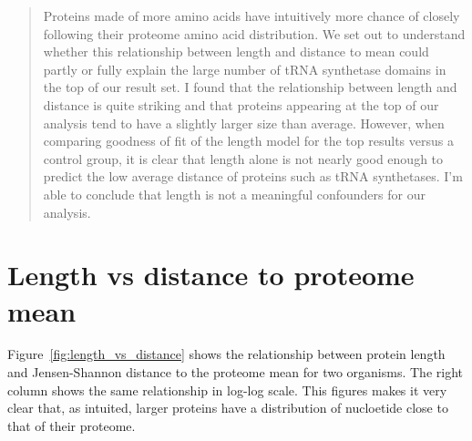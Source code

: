 \documentclass[12pt]{article}
\begin{document}
\maketitle

\begin{abstract}
Proteins made of more amino acids have intuitively more chance of closely following their proteome amino acid distribution. We set out to understand whether this relationship between length and distance to mean could partly or fully explain the large number of tRNA synthetase domains in the top of our result set. I found that the relationship between length and distance is quite striking and that proteins appearing at the top of our analysis tend to have a slightly larger size than average. However, when comparing goodness of fit of the length model for the top results versus a control group, it is clear that length alone is not nearly good enough to predict the low average distance of proteins such as tRNA synthetases. I'm able to conclude that length is not a meaningful confounders for our analysis.
\end{abstract}

\section{Length vs distance to proteome mean}

Figure~\ref{fig:length_vs_distance} shows the relationship between protein length and Jensen-Shannon distance to the proteome mean for two organisms. The right column shows the same relationship in log-log scale. This figures makes it very clear that, as intuited, larger proteins have a distribution of nucloetide close to that of their proteome.

\pagebreak
\end{document}
